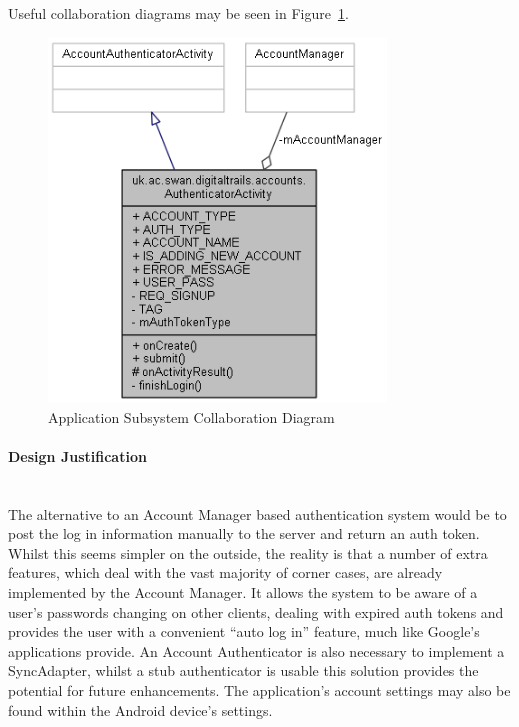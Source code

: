 \documentclass[11pt,a4paper]{report}
\begin{document}
Useful collaboration diagrams may be seen in Figure~\ref{fig:authactivitycollab}.
\begin{figure}[H]
    \centering
    \includegraphics[width=0.8\textwidth]{authactivitycollab}
    \caption{Application Subsystem Collaboration Diagram}
    \label{fig:authactivitycollab}
\end{figure}

\paragraph*{Design Justification}\mbox{}\\ 
The alternative to an Account Manager based authentication system would be to post the log in information manually to the server and return an auth token. Whilst this seems simpler on the outside, the reality is that a number of extra features, which deal with the vast majority of corner cases, are already implemented by the Account Manager. It allows the system to be aware of a user's passwords changing on other clients, dealing with expired auth tokens and provides the user with a convenient ``auto log in'' feature, much like Google's applications provide. An Account Authenticator is also necessary to implement a SyncAdapter, whilst a stub authenticator is usable this solution provides the potential for future enhancements. The application's account settings may also be found within the Android device's settings.
\end{document}
